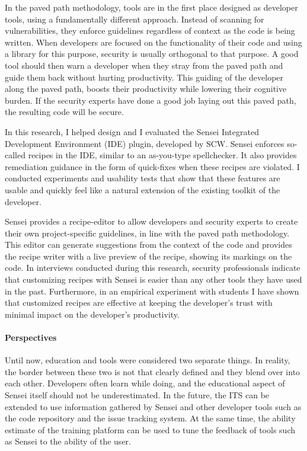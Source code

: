 In the paved path methodology, tools are in the first place designed as developer tools, using a fundamentally different approach.
Instead of scanning for vulnerabilities, they enforce guidelines regardless of context as the code is being written.
When developers are focused on the functionality of their code and using a library for this purpose, security is usually orthogonal to that purpose.
A good tool should then warn a developer when they stray from the paved path and guide them back without hurting productivity.
This guiding of the developer along the paved path, boosts their productivity while lowering their cognitive burden.
If the security experts have done a good job laying out this paved path, the resulting code will be secure.

In this research, I helped design and I evaluated the Sensei Integrated Development Environment (IDE) plugin, developed by SCW.
Sensei enforces so-called recipes in the IDE, similar to an as-you-type spellchecker.
It also provides remediation guidance in the form of quick-fixes when these recipes are violated.
I conducted experiments and usability tests that show that these features are usable and quickly feel like a natural extension of the existing toolkit of the developer.

Sensei provides a recipe-editor to allow developers and security experts to create their own project-specific guidelines, in line with the paved path methodology.
This editor can generate suggestions from the context of the code and provides the recipe writer with a live preview of the recipe, showing its markings on the code.
In interviews conducted during this research, security professionals indicate that customizing recipes with Sensei is easier than any other tools they have used in the past.
Furthermore, in an empirical experiment with students I have shown that customized recipes are effective at keeping the developer's trust with minimal impact on the developer's productivity.

\paragraph{Perspectives}
Until now, education and tools were considered two separate things.
In reality, the border between these two is not that clearly defined and they blend over into each other.
Developers often learn while doing, and the educational aspect of Sensei itself should not be underestimated.
In the future, the ITS can be extended to use information gathered by Sensei and other developer tools such as the code repository and the issue tracking system.
At the same time, the ability estimate of the training platform can be used to tune the feedback of tools such as Sensei to the ability of the user.
